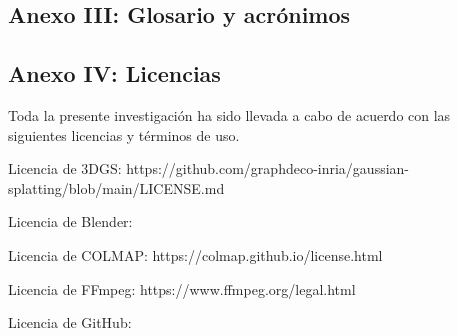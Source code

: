 \documentclass[a4paper, 12pt, spanish, twoside]{article}
\begin{document}
\clearpage




\newpage
\subsection{Anexo III: Glosario y acrónimos} \label{sec:anexo3}

\glsaddall


\printglossary[title=Glosario, toctitle=Glosario]

\newpage
\printglossary[type=\acronymtype, title={Abreviaturas, unidades y acrónimos}, toctitle={Abreviaturas, unidades y acrónimos}]


\clearpage




\newpage
\subsection{Anexo IV: Licencias} \label{sec:anexo4}

Toda la presente investigación ha sido llevada a cabo de acuerdo con las siguientes licencias y términos de uso.

Licencia de 3DGS: https://github.com/graphdeco-inria/gaussian-splatting/blob/main/LICENSE.md

Licencia de Blender: 

Licencia de COLMAP: https://colmap.github.io/license.html

Licencia de FFmpeg: https://www.ffmpeg.org/legal.html

Licencia de GitHub: 
\end{document}
